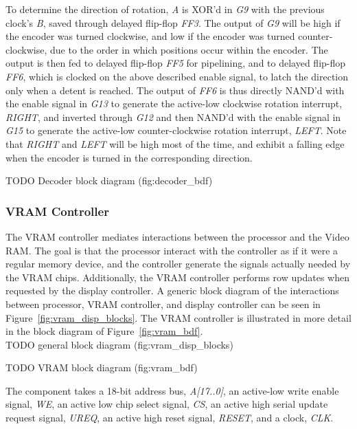 \documentclass{scrartcl}
\begin{document}
	To determine the direction of rotation, \textit{A} is XOR'd in \textit{G9} with the previous clock's \textit{B}, saved through delayed flip-flop \textit{FF3}. The output of \textit{G9} will be high if the encoder was turned clockwise, and low if the encoder was turned counter-clockwise, due to the order in which positions occur within the encoder. The output is then fed to delayed flip-flop \textit{FF5} for pipelining, and to delayed flip-flop \textit{FF6}, which is clocked on the above described enable signal, to latch the direction only when a detent is reached. The output of \textit{FF6} is thus directly NAND'd with the enable signal in \textit{G13} to generate the active-low clockwise rotation interrupt, \textit{RIGHT}, and inverted through \textit{G12} and then NAND'd with the enable signal in \textit{G15} to generate the active-low counter-clockwise rotation interrupt, \textit{LEFT}. Note that \textit{RIGHT} and \textit{LEFT} will be high most of the time, and exhibit a falling edge when the encoder is turned in the corresponding direction.

	TODO Decoder block diagram (fig:decoder_bdf)
	
	\subsubsection{VRAM Controller \label{sec:vram_ctrl}}
	The VRAM controller mediates interactions between the processor and the Video RAM. The goal is that the processor interact with the controller as if it were a regular memory device, and the controller generate the signals actually needed by the VRAM chips. Additionally, the VRAM controller performs row updates when requested by the display controller. A generic block diagram of the interactions between processor, VRAM controller, and display controller can be seen in Figure~\ref{fig:vram_disp_blocks}. The VRAM controller is illustrated in more detail in the block diagram of Figure~\ref{fig:vram_bdf}.\\

 	TODO general block diagram (fig:vram_disp_blocks)

	TODO VRAM block diagram (fig:vram_bdf)

	The component takes a 18-bit address bus, \textit{A[17..0]}, an active-low write enable signal, \textit{WE}, an active low chip select signal, \textit{CS}, an active high serial update request signal, \textit{UREQ}, an active high reset signal, \textit{RESET}, and a clock, \textit{CLK}.\\
\end{document}

